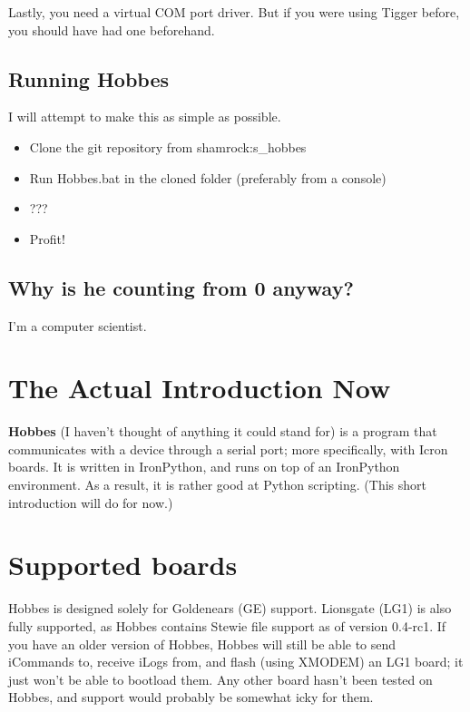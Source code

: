 Lastly, you need a virtual COM port driver. But if you were using Tigger before, you should have had one beforehand.



%
%
\subsection{Running Hobbes}
\label{0.1}

I will attempt to make this as simple as possible.

\begin{itemize}
\item Clone the git repository from shamrock:s\_hobbes
\item Run Hobbes.bat in the cloned folder (preferably from a console)
\item ???
\item Profit!
\end{itemize}



%
%
\subsection{Why is he counting from 0 anyway?}
\label{0.2}

I'm a computer scientist.



%
%
\section{The Actual Introduction Now}
\label{1}

\textbf{Hobbes} (I haven't thought of anything it could stand for) is a program that communicates with a device through a serial port; more specifically, with Icron boards. It is written in IronPython, and runs on top of an IronPython environment. As a result, it is rather good at Python scripting. (This short introduction will do for now.)



%
%
\section{Supported boards}
\label{2}
Hobbes is designed solely for Goldenears (GE) support. Lionsgate (LG1) is also fully supported, as Hobbes contains Stewie file support as of version 0.4-rc1. If you have an older version of Hobbes, Hobbes will still be able to send iCommands to, receive iLogs from, and flash (using XMODEM) an LG1 board; it just won't be able to bootload them. Any other board hasn't been tested on Hobbes, and support would probably be somewhat icky for them.



